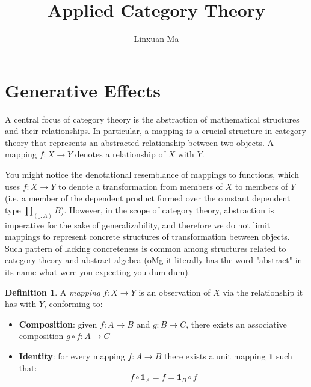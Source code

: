 \documentclass[12pt]{article}
\title{Applied Category Theory}
\author{Linxuan Ma}
\theoremstyle{definition}
\newtheorem{defn}{Definition }[section]
\begin{document}
	\maketitle
	
	
	\section{Generative Effects}
	
	A central focus of category theory is the abstraction of mathematical structures and their relationships. In particular, a mapping is a crucial structure in category theory that represents an abstracted relationship between two objects. A mapping $f: X \to Y$ denotes a relationship of $X$ with $Y$.
	
	You might notice the denotational resemblance of mappings to functions, which uses $f: X \to Y$ to denote a transformation from members of $X$ to members of $Y$ (i.e. a member of the dependent product formed over the constant dependent type $\prod_{(\_:A)}B$). However, in the scope of category theory, abstraction is imperative for the sake of generalizability, and therefore we do not limit mappings to represent concrete structures of transformation between objects. Such pattern of lacking concreteness is common among structures related to category theory and abstract algebra (oMg it literally has the word "abstract" in its name what were you expecting you dum dum).
	
	\begin{defn}
		A \emph{mapping} $f: X \to Y$ is an observation of $X$ via the relationship it has with $Y$, conforming to:
		\begin{itemize}
			\item \textbf{Composition}: given $f: A \to B$ and $g: B \to C$, there exists an associative composition $g \circ f: A \to C$
			\item \textbf{Identity}: for every mapping $f: A \to B$ there exists a unit mapping $\textbf{1}$ such that: $$f \circ \textbf{1}_A = f = \textbf{1}_B \circ f$$
		\end{itemize}
	\end{defn}
	
\end{document}
